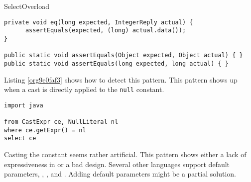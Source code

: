 \begin{pattern}{SelectOverload}
\begin{verbatim}
private void eq(long expected, IntegerReply actual) {
      assertEquals(expected, (long) actual.data());
}

public static void assertEquals(Object expected, Object actual) { }
public static void assertEquals(long expected, long actual) { }
\end{verbatim}

\detection{}
Listing \ref{org9e0faf3} shows how to detect this pattern.
This pattern shows up when a cast is directly applied to the \texttt{null} constant.

\begin{lstlisting}
import java

from CastExpr ce, NullLiteral nl
where ce.getExpr() = nl
select ce
\end{lstlisting}

\discussion{}
Casting the  constant seems rather artificial.
This pattern shows either a lack of expressiveness in \java{} or
a bad \api{} design.
Several other languages support default parameters, \eg{},
\scala{}, \cs{} and \cpp{}.
Adding default parameters might be a partial solution.
\end{pattern}